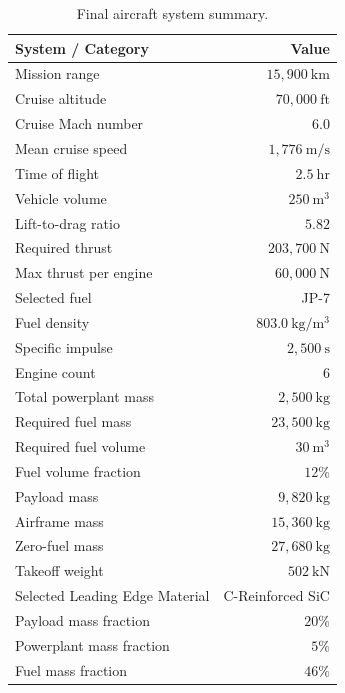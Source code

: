 \documentclass[10pt,a4paper]{article}
\begin{document}
\begin{table}[htbp]
    \centering
    \caption{Final aircraft system summary.}
    \label{tab:breguet-final-system-summary}
    \begin{tabular}{lr}
        \hline
        System / Category & Value \\
        \hline
        Mission range & $15{,}900~\mathrm{km}$ \\
        Cruise altitude & $70{,}000~\mathrm{ft}$ \\
        Cruise Mach number & $6.0$ \\
        Mean cruise speed & $1{,}776~\mathrm{m/s}$  \\
        Time of flight & $2.5~\mathrm{hr}$  \\
        Vehicle volume & $250~\mathrm{m^3}$ \\
        Lift-to-drag ratio & $5.82$ \\
        Required thrust & $203{,}700~\mathrm{N}$ \\
        Max thrust per engine & $60{,}000~\mathrm{N}$ \\
        Selected fuel & JP-7 \\
        Fuel density & $803.0~\mathrm{kg/m^3}$ \\
        Specific impulse & $2{,}500~\mathrm{s}$ \\
        Engine count & $6$ \\
        Total powerplant mass & $2{,}500~\mathrm{kg}$  \\
        Required fuel mass & $23{,}500~\mathrm{kg}$ \\
        Required fuel volume & $30~\mathrm{m^3}$ \\
        Fuel volume fraction & $12\%$ \\
        Payload mass & $9{,}820~\mathrm{kg}$ \\
        Airframe mass & $15{,}360~\mathrm{kg}$ \\
        Zero-fuel mass & $27{,}680~\mathrm{kg}$ \\
        Takeoff weight & $502~\mathrm{kN}$ \\
        Selected Leading Edge Material & C-Reinforced SiC \\
        Payload mass fraction & $20\%$ \\
        Powerplant mass fraction & $5\%$ \\
        Fuel mass fraction & $46\%$ \\
        \hline
    \end{tabular}
\end{table}
\end{document}
